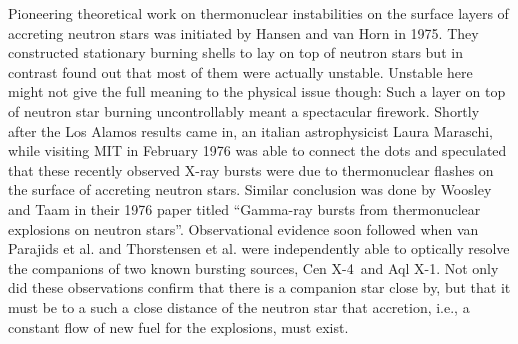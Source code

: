 %
%
Pioneering theoretical work on thermonuclear instabilities on the surface layers of accreting neutron stars was initiated by Hansen and van Horn in 1975.\cite{HvH75}
They constructed stationary burning shells to lay on top of neutron stars but in contrast found out that most of them were actually unstable.
Unstable here might not give the full meaning to the physical issue though:
Such a layer on top of neutron star burning uncontrollably meant a spectacular firework.
Shortly after the Los Alamos results came in, an italian astrophysicist Laura Maraschi, while visiting MIT in February 1976 was able to connect the dots and speculated that these recently observed X-ray bursts were due to thermonuclear flashes on the surface of accreting neutron stars.\cite{MC77, Lewin93}
Similar conclusion was done by Woosley and Taam in their 1976 paper titled ``Gamma-ray bursts from thermonuclear explosions on neutron stars''.
Observational evidence soon followed when van Parajids et al. and Thorstensen et al. were independently able to optically resolve the companions of two known bursting sources, Cen X-4\cite{vPV80} and Aql X-1\cite{TCB78}.
Not only did these observations confirm that there is a companion star close by, but that it must be to a such a close distance of the neutron star that accretion, i.e., a constant flow of new fuel for the explosions, must exist.


